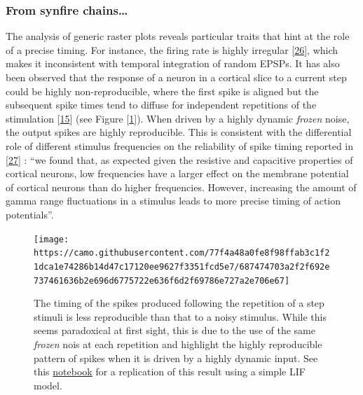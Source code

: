 \hypertarget{from-synfire-chains}{%
\subsubsection{From synfire chains\ldots{}}\label{from-synfire-chains}}

The analysis of generic raster plots reveals particular traits that hint at the role of a precise timing. For instance, the firing rate is highly irregular {[}\protect\hyperlink{ref-sYHyiGsP}{26}{]}, which makes it inconsistent with temporal integration of random EPSPs. It has also been observed that the response of a neuron in a cortical slice to a current step could be highly non-reproducible, where the first spike is aligned but the subsequent spike times tend to diffuse for independent repetitions of the stimulation {[}\protect\hyperlink{ref-XsHCA4IZ}{15}{]} (see Figure {[}\ref{fig:mainen}{]}). When driven by a highly dynamic \emph{frozen} noise, the output spikes are highly reproducible. This is consistent with the differential role of different stimulus frequencies on the reliability of spike timing reported in {[}\protect\hyperlink{ref-1AbvCTG03}{27}{]} : ``we found that, as expected given the resistive and capacitive properties of cortical neurons, low frequencies have a larger effect on the membrane potential of cortical neurons than do higher frequencies. However, increasing the amount of gamma range fluctuations in a stimulus leads to more precise timing of action potentials''.

\begin{figure}
\hypertarget{fig:mainen}{%
\centering
\texttt{[image: https://camo.githubusercontent.com/77f4a48a0fe8f98ffab3c1f21dca1e74286b14d47c17120ee9627f3351fcd5e7/687474703a2f2f692e737461636b2e696d6775722e636f6d2f69786e727a2e706e67]}
\caption{The timing of the spikes produced following the repetition of a step stimuli is less reproducible than that to a noisy stimulus. While this seems paradoxical at first sight, this is due to the use of the same \emph{frozen} nois at each repetition and highlight the highly reproducible pattern of spikes when it is driven by a highly dynamic input. See this \href{https://github.com/laurentperrinet/2022_UE-neurosciences-computationnelles/blob/master/C_MainenSejnowski1995.ipynb}{notebook} for a replication of this result using a simple LIF model.}\label{fig:mainen}
}
\end{figure}

